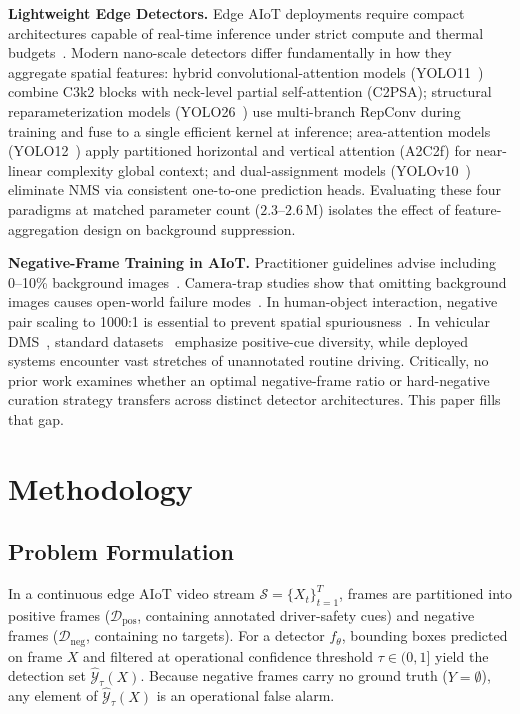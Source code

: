 \documentclass[conference]{IEEEtran}
\begin{document}
\textbf{Lightweight Edge Detectors.}
Edge AIoT deployments require compact architectures capable of
real-time inference under strict compute and thermal
budgets~\cite{wang2023microedge}. Modern nano-scale detectors
differ fundamentally in how they aggregate spatial features: hybrid
convolutional-attention models (YOLO11~\cite{jocher2024yolo11})
combine C3k2 blocks with neck-level partial self-attention (C2PSA);
structural reparameterization models (YOLO26~\cite{ultralytics2026yolo26})
use multi-branch RepConv during training and fuse to a single
efficient kernel at inference; area-attention models
(YOLO12~\cite{tian2025yolo12}) apply partitioned horizontal and
vertical attention (A2C2f) for near-linear complexity global context;
and dual-assignment models (YOLOv10~\cite{wang2024yolov10}) eliminate
NMS via consistent one-to-one prediction heads. Evaluating these four
paradigms at matched parameter count ($2.3$--$2.6$\,M) isolates the
effect of feature-aggregation design on background suppression.

\textbf{Negative-Frame Training in AIoT.}
Practitioner guidelines advise including 0--10\% background
images~\cite{ultralytics2024tips}. Camera-trap studies show that
omitting background images causes open-world failure
modes~\cite{beery2018terra}. In human-object interaction, negative
pair scaling to 1000:1 is essential to prevent spatial spuriousness~\cite{gupta2019nofrills}.
In vehicular DMS~\cite{sengupta2023dms,fridman2019cognitive},
standard datasets~\cite{statefarm2016,ortega2020dmd} emphasize
positive-cue diversity, while deployed systems encounter vast
stretches of unannotated routine driving. Critically, no prior work
examines whether an optimal negative-frame ratio or hard-negative
curation strategy transfers across distinct detector architectures.
This paper fills that gap.

\section{Methodology}
\label{sec:methodology}

\subsection{Problem Formulation}
\label{subsec:formulation}

In a continuous edge AIoT video stream
$\mathcal{S} = \{X_t\}_{t=1}^T$, frames are partitioned into
positive frames ($\mathcal{D}_{\mathrm{pos}}$, containing annotated
driver-safety cues) and negative frames
($\mathcal{D}_{\mathrm{neg}}$, containing no targets). For a
detector $f_\theta$, bounding boxes predicted on frame $X$ and
filtered at operational confidence threshold $\tau \in (0,1]$ yield
the detection set $\hat{\mathcal{Y}}_\tau(X)$. Because negative
frames carry no ground truth ($Y = \emptyset$), any element of
$\hat{\mathcal{Y}}_\tau(X)$ is an operational false alarm.
\end{document}
